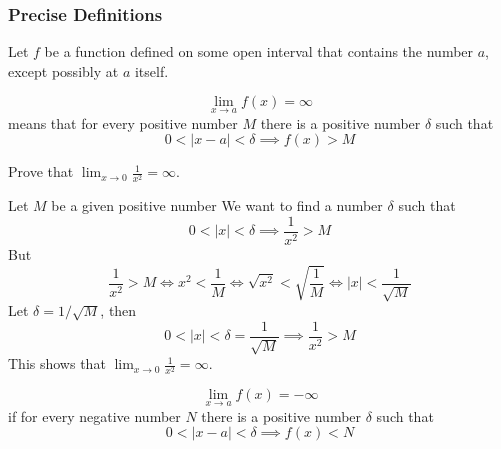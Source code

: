 \subsubsection*{Precise Definitions}
Let \(f\) be a function defined on some open interval that contains the number
\(a\),
except possibly at \(a\) itself.
\begin{definition}
    \[\lim_{x\to a}f(x)=\infty\]
    means that for every positive number \(M\) there is a positive number
    \(\delta\) such that
    \[0<|x-a|<\delta\implies f(x)>M\]
\end{definition}
\begin{problem}
    Prove that \(\displaystyle{\lim_{x\to 0}\frac{1}{x^2}=\infty}\).
\end{problem}
\begin{solution}
    Let \(M\) be a given positive number
    We want to find a number \(\delta\) such that
    \[0<|x|<\delta\implies\frac{1}{x^2}>M\]
    But
    \[\frac{1}{x^2}>M\iff x^2<\frac{1}{M}\iff\sqrt{x^2}<\sqrt{\frac{1}{M}}
    \iff|x|<\frac{1}{\sqrt{M}}\]
    Let \(\delta=1/\sqrt{M}\),
    then
    \[0<|x|<\delta=\frac{1}{\sqrt{M}}\implies\frac{1}{x^2}>M\]
    This shows that
    \(\displaystyle{\lim_{x\to 0}\frac{1}{x^2}=\infty}\).
\end{solution}
\begin{definition}
    \[\lim_{x\to a}f(x)=-\infty\]
    if for every negative number \(N\) there is a positive number \(\delta\)
    such that
    \[0<|x-a|<\delta\implies f(x)<N\]
\end{definition}

